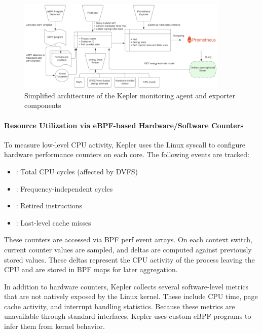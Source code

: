 \begin{figure}[ht]
  \centering
  \includegraphics[width=0.9\textwidth]{Figures/kepler_architecture.png}
  \caption{Simplified architecture of the Kepler monitoring agent and exporter components\parencite{kepler_docs}}
  \label{fig:kepler-architecture}
\end{figure}

\paragraph{Resource Utilization via eBPF-based Hardware/Software Counters}

To measure low-level CPU activity, Kepler uses the Linux syscall  to configure hardware performance counters on each core. The following events are tracked:
\begin{itemize}
  \item {}: Total CPU cycles (affected by DVFS)
  \item {}: Frequency-independent cycles
  \item {}: Retired instructions
  \item {}: Last-level cache misses
\end{itemize}

These counters are accessed via BPF perf event arrays. On each context switch, current counter values are sampled, and deltas are computed against previously stored values. These deltas represent the CPU activity of the process leaving the CPU and are stored in BPF maps for later aggregation.

In addition to hardware counters, Kepler collects several software-level metrics that are not natively exposed by the Linux kernel. These include CPU time, page cache activity, and interrupt handling statistics. Because these metrics are unavailable through standard interfaces, Kepler uses custom eBPF programs to infer them from kernel behavior.

